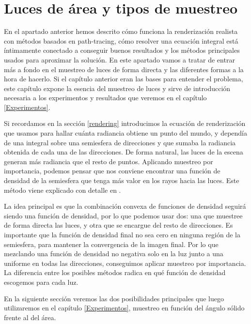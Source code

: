 \documentclass{scrbook}
\begin{document}
\chapter{Luces de área y tipos de muestreo}

\label{lucesdir}
En el apartado anterior hemos descrito cómo funciona la renderización realista con métodos basados en path-tracing, cómo resolver una ecuación integral está íntimamente conectado a conseguir buenos resultados y los métodos principales usados para aproximar la solución. En este apartado vamos a tratar de entrar más a fondo en el muestreo de luces de forma directa y las diferentes formas a la hora de hacerlo. Si el capítulo anterior eran las bases para entender el problema, este capítulo expone la esencia del muestreo de luces y sirve de introducción necesaria a los experimentos y resultados que veremos en el capítulo \ref{Experimentos}.

Si recordamos en la sección \ref{rendering} introducimos la ecuación de renderización que usamos para hallar cuánta radiancia obtiene un punto del mundo, y dependía de una integral sobre una semiesfera de direcciones y que sumaba la radiancia obtenida de cada una de las direcciones. De forma natural, las luces de la escena generan más radiancia que el resto de puntos. Aplicando muestreo por importancia, podemos pensar que nos conviene encontrar una función de densidad de la semiesfera que tenga más valor en los rayos hacia las luces. Este método viene explicado con detalle en \cite[Secciones~6-9]{RestOfYourLife}. 

La idea principal es que la combinación convexa de funciones de densidad seguirá siendo una función de densidad, por lo que podemos usar dos: una que muestree de forma directa las luces, y otra que se encargue del resto de direcciones. Es importante que la función de densidad final no sea cero en ninguna región de la semiesfera, para mantener la convergencia de la imagen final. Por lo que mezclando una función de densidad no negativa solo en la luz junto a una uniforme en todas las direcciones, conseguimos aplicar muestreo por importancia. La diferencia entre los posibles métodos radica en qué función de densidad escogemos para cada luz.

En la siguiente sección veremos las dos posibilidades principales que luego utilizaremos en el capítulo \ref{Experimentos}, muestreo en función del ángulo sólido frente al del área.
\end{document}
